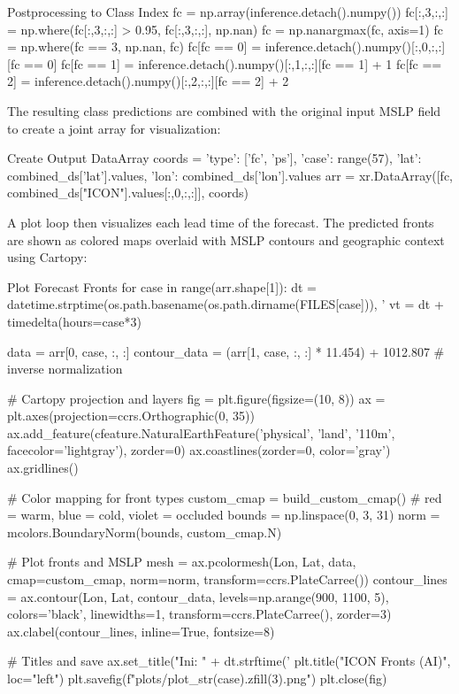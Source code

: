 \begin{codeonly}{Postprocessing to Class Index}
fc          = np.array(inference.detach().numpy())
fc[:,3,:,:] = np.where(fc[:,3,:,:] > 0.95, fc[:,3,:,:], np.nan)
fc          = np.nanargmax(fc, axis=1)
fc          = np.where(fc == 3, np.nan, fc)
fc[fc == 0] = inference.detach().numpy()[:,0,:,:][fc == 0]
fc[fc == 1] = inference.detach().numpy()[:,1,:,:][fc == 1] + 1
fc[fc == 2] = inference.detach().numpy()[:,2,:,:][fc == 2] + 2
\end{codeonly}

The resulting class predictions are combined with the original input MSLP field to create a joint array for visualization:

\begin{codeonly}{Create Output DataArray}
coords = {'type': ['fc', 'ps'],
          'case': range(57),
          'lat': combined_ds['lat'].values,
          'lon': combined_ds['lon'].values}
arr = xr.DataArray([fc, combined_ds["ICON"].values[:,0,:,:]], coords)
\end{codeonly}

A plot loop then visualizes each lead time of the forecast. The predicted fronts are shown as colored maps overlaid with MSLP contours and geographic context using Cartopy:

\begin{codeonly}{Plot Forecast Fronts}
for case in range(arr.shape[1]):
    dt = datetime.strptime(os.path.basename(os.path.dirname(FILES[case])), '%
    vt = dt + timedelta(hours=case*3)

    data         = arr[0, case, :, :]
    contour_data = (arr[1, case, :, :] * 11.454) + 1012.807  # inverse normalization

    # Cartopy projection and layers
    fig = plt.figure(figsize=(10, 8))
    ax = plt.axes(projection=ccrs.Orthographic(0, 35))
    ax.add_feature(cfeature.NaturalEarthFeature('physical', 'land', '110m', facecolor='lightgray'), zorder=0)
    ax.coastlines(zorder=0, color='gray')
    ax.gridlines()

    # Color mapping for front types
    custom_cmap = build_custom_cmap()  # red = warm, blue = cold, violet = occluded
    bounds = np.linspace(0, 3, 31)
    norm = mcolors.BoundaryNorm(bounds, custom_cmap.N)

    # Plot fronts and MSLP
    mesh = ax.pcolormesh(Lon, Lat, data, cmap=custom_cmap, norm=norm, transform=ccrs.PlateCarree())
    contour_lines = ax.contour(Lon, Lat, contour_data, levels=np.arange(900, 1100, 5),
                               colors='black', linewidths=1, transform=ccrs.PlateCarree(), zorder=3)
    ax.clabel(contour_lines, inline=True, fontsize=8)

    # Titles and save
    ax.set_title("Ini: " + dt.strftime('%
    plt.title("ICON Fronts (AI)", loc="left")
    plt.savefig(f"plots/plot_{str(case).zfill(3)}.png")
    plt.close(fig)
\end{codeonly}

